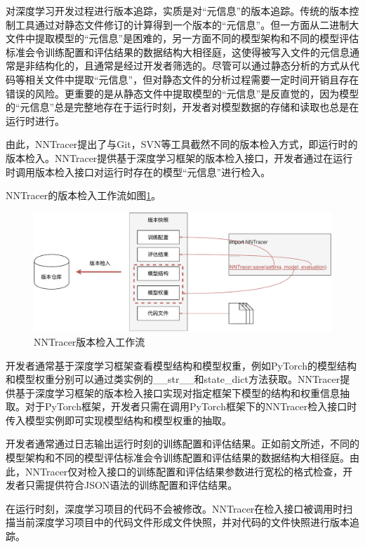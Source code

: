 \documentclass{cjc}
\begin{document}
对深度学习开发过程进行版本追踪，实质是对“元信息”的版本追踪。传统的版本控制工具通过对静态文件修订的计算得到一个版本的“元信息”。但一方面从二进制大文件中提取模型的“元信息”是困难的，另一方面不同的模型架构和不同的模型评估标准会令训练配置和评估结果的数据结构大相径庭，这使得被写入文件的元信息通常是非结构化的，且通常是经过开发者筛选的。尽管可以通过静态分析的方式从代码等相关文件中提取“元信息”，但对静态文件的分析过程需要一定时间开销且存在错误的风险。更重要的是从静态文件中提取模型的“元信息”是反直觉的，因为模型的“元信息”总是完整地存在于运行时刻，开发者对模型数据的存储和读取也总是在运行时进行。

由此，NNTracer提出了与Git，SVN等工具截然不同的版本检入方式，即运行时的版本检入。NNTracer提供基于深度学习框架的版本检入接口，开发者通过在运行时调用版本检入接口对运行时存在的模型“元信息”进行检入。

NNTracer的版本检入工作流如图\ref{checkin}。

\begin{figure}[htb]
  \centering
  \includegraphics[width=\linewidth]{checkin.pdf}
  \caption{NNTracer版本检入工作流}
  \label{checkin}
\end{figure}

开发者通常基于深度学习框架查看模型结构和模型权重，例如PyTorch的模型结构和模型权重分别可以通过类实例的\_\_str\_\_和state\_dict方法获取。NNTracer提供基于深度学习框架的版本检入接口实现对指定框架下模型的结构和权重信息抽取。对于PyTorch框架，开发者只需在调用PyTorch框架下的NNTracer检入接口时传入模型实例即可实现模型结构和模型权重的抽取。

开发者通常通过日志输出运行时刻的训练配置和评估结果。正如前文所述，不同的模型架构和不同的模型评估标准会令训练配置和评估结果的数据结构大相径庭。由此，NNTracer仅对检入接口的训练配置和评估结果参数进行宽松的格式检查，开发者只需提供符合JSON语法的训练配置和评估结果。

在运行时刻，深度学习项目的代码不会被修改。NNTracer在检入接口被调用时扫描当前深度学习项目中的代码文件形成文件快照，并对代码的文件快照进行版本追踪。
\end{document}
